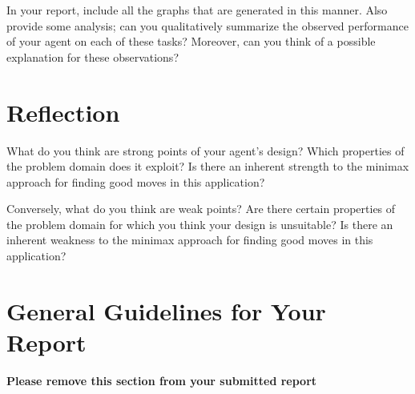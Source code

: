 \documentclass[11pt]{article}
\begin{document}
In your report, include all the graphs that are generated in this manner. Also provide some analysis; can you qualitatively summarize the observed performance of your agent on each of these tasks? Moreover, can you think of a possible explanation for these observations?


\section{Reflection}\label{sec:reflect}
What do you think are strong points of your agent's design? Which properties of the problem domain does it exploit? Is there an inherent strength to the minimax approach for finding good moves in this application?

Conversely, what do you think are weak points? Are there certain properties of the problem domain for which you think your design is unsuitable? Is there an inherent weakness to the minimax approach for finding good moves in this application?


\section*{General Guidelines for Your Report}
\textbf{Please remove this section from your submitted report}
\end{document}

